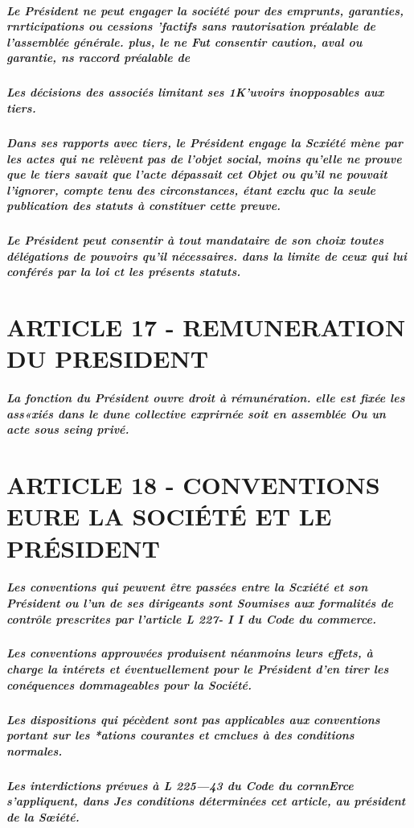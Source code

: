 \documentclass[a4paper, 11pt]{article}
\begin{document}
\subparagraph{
  Le Président ne peut engager la société pour des emprunts, garanties, rnrticipations ou cessions 'factifs sans rautorisation préalable de l'assemblée générale. plus, le ne Fut consentir caution, aval ou garantie, ns raccord préalable de
}

\subparagraph{
  Les décisions des associés limitant ses 1K'uvoirs inopposables aux tiers.
}

\subparagraph{
  Dans ses rapports avec tiers, le Président engage la Scxiété mène par les actes qui ne relèvent pas de l'objet social, moins qu'elle ne prouve que le tiers savait que l'acte dépassait cet Objet ou qu'il ne pouvait l'ignorer, compte tenu des circonstances, étant exclu quc la seule publication des statuts à constituer cette preuve.
}

\subparagraph{
  Le Président peut consentir à tout mandataire de son choix toutes délégations de pouvoirs qu'il nécessaires. dans la limite de ceux qui lui conférés par la loi ct les présents statuts.
}

\section*{ARTICLE 17 - REMUNERATION DU PRESIDENT}

\subparagraph{
  La fonction du Président ouvre droit à rémunération. elle est fixée les ass«xiés dans le dune collective exprirnée soit en assemblée Ou un acte sous seing privé.
}

\section*{ARTICLE 18 - CONVENTIONS EURE LA SOCIÉTÉ ET LE PRÉSIDENT}

\subparagraph{
  Les conventions qui peuvent être passées entre la Scxiété et son Président ou l'un de ses dirigeants sont Soumises aux formalités de contrôle prescrites par l'article L 227- I I du Code du commerce.
}

\subparagraph{
  Les conventions approuvées produisent néanmoins leurs effets, à charge la intérets et éventuellement pour le Président d'en tirer les conéquences dommageables pour la Société.
}

\subparagraph{
  Les dispositions qui pécèdent sont pas applicables aux conventions portant sur les *ations courantes et cmclues à des conditions normales.
}

\subparagraph{
  Les interdictions prévues à L 225—43 du Code du cornnErce s'appliquent, dans Jes conditions déterminées cet article, au président de la Sœiété.
}
\end{document}
